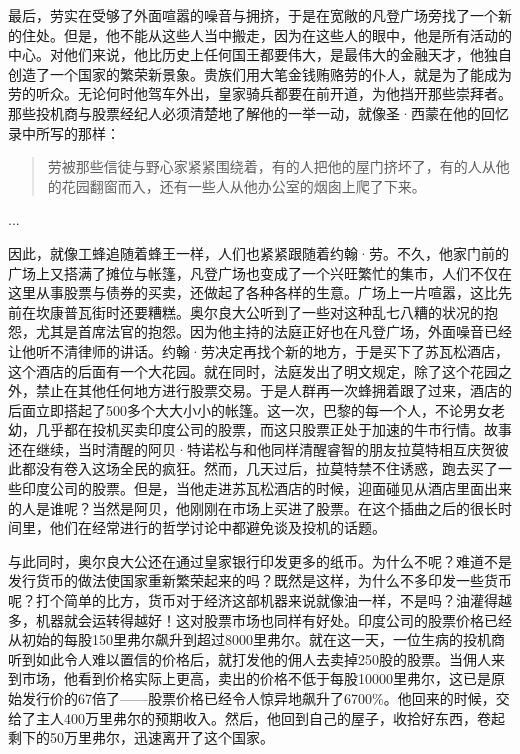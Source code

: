\documentclass[12pt,oneside]{book}
\begin{document}
\begin{mdframed}
最后，劳实在受够了外面喧嚣的噪音与拥挤，于是在宽敞的凡登广场旁找了一个新的住处。但是，他不能从这些人当中搬走，因为在这些人的眼中，他是所有活动的中心。对他们来说，他比历史上任何国王都要伟大，是最伟大的金融天才，他独自创造了一个国家的繁荣新景象。贵族们用大笔金钱贿赂劳的仆人，就是为了能成为劳的听众。无论何时他驾车外出，皇家骑兵都要在前开道，为他挡开那些崇拜者。那些投机商与股票经纪人必须清楚地了解他的一举一动，就像圣·西蒙在他的回忆录中所写的那样：

\begin{quote}
劳被那些信徒与野心家紧紧围绕着，有的人把他的屋门挤坏了，有的人从他的花园翻窗而入，还有一些人从他办公室的烟囱上爬了下来。
\end{quote}

...

因此，就像工蜂追随着蜂王一样，人们也紧紧跟随着约翰·劳。不久，他家门前的广场上又搭满了摊位与帐篷，凡登广场也变成了一个兴旺繁忙的集市，人们不仅在这里从事股票与债券的买卖，还做起了各种各样的生意。广场上一片喧嚣，这比先前在坎康普瓦街时还要糟糕。奥尔良大公听到了一些对这种乱七八糟的状况的抱怨，尤其是首席法官的抱怨。因为他主持的法庭正好也在凡登广场，外面噪音已经让他听不清律师的讲话。约翰·劳决定再找个新的地方，于是买下了苏瓦松酒店，这个酒店的后面有一个大花园。就在同时，法庭发出了明文规定，除了这个花园之外，禁止在其他任何地方进行股票交易。于是人群再一次蜂拥着跟了过来，酒店的后面立即搭起了500多个大大小小的帐篷。这一次，巴黎的每一个人，不论男女老幼，几乎都在投机买卖印度公司的股票，而这只股票正处于加速的牛市行情。故事还在继续，当时清醒的阿贝·特诺松与和他同样清醒睿智的朋友拉莫特相互庆贺彼此都没有卷入这场全民的疯狂。然而，几天过后，拉莫特禁不住诱惑，跑去买了一些印度公司的股票。但是，当他走进苏瓦松酒店的时候，迎面碰见从酒店里面出来的人是谁呢？当然是阿贝，他刚刚在市场上买进了股票。在这个插曲之后的很长时间里，他们在经常进行的哲学讨论中都避免谈及投机的话题。

与此同时，奥尔良大公还在通过皇家银行印发更多的纸币。为什么不呢？难道不是发行货币的做法使国家重新繁荣起来的吗？既然是这样，为什么不多印发一些货币呢？打个简单的比方，货币对于经济这部机器来说就像油一样，不是吗？油灌得越多，机器就会运转得越好！这对股票市场也同样有好处。印度公司的股票价格已经从初始的每股150里弗尔飙升到超过8000里弗尔。就在这一天，一位生病的投机商听到如此令人难以置信的价格后，就打发他的佣人去卖掉250股的股票。当佣人来到市场，他看到价格实际上更高，卖出的价格不低于每股10000里弗尔，这已是原始发行价的67倍了——股票价格已经令人惊异地飙升了6700\%。他回来的时候，交给了主人400万里弗尔的预期收入。然后，他回到自己的屋子，收拾好东西，卷起剩下的50万里弗尔，迅速离开了这个国家。


\end{mdframed}
\end{document}
